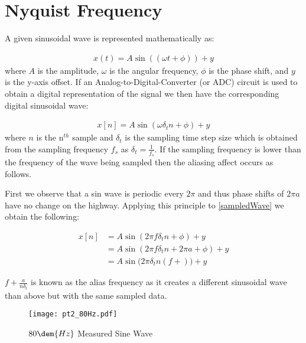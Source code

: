 \documentclass[main.tex]{subfile}
\begin{document}
\section{Nyquist Frequency} 
\label{sec:nyquist_frequency}

A given sinusoidal wave is represented mathematically as:

\begin{align}
  x(t) = A\sin{((\omega t + \phi))} + y
\end{align}
where $A$ is the amplitude, $\omega$ is the angular frequency, $\phi$ is the
phase shift, and $y$ is the y-axis offset. If an Analog-to-Digital-Converter (or
ADC) circuit is used to obtain a digital representation of the signal we then
have the corresponding digital sinusoidal wave: 

\begin{align}
  x[n] = A\sin{(\omega \delta_{t} n + \phi)} + y \label{eq:sampledWave}
\end{align}
where $n$ is the n$^{th}$ sample and $\delta_{t}$ is the sampling time step size
which is obtained from the sampling frequency $f_s$ as $\delta_{t} =
\frac{1}{f_s}$. If the sampling frequency is lower than the frequency of the
wave being sampled then the aliasing affect occurs as follows.

First we observe that a sin wave is periodic every $2\pi$ and thus phase shifts
of $2\pi a$ have no change on the highway. Applying this principle to \eqref{sampledWave}
we obtain the following:

\begin{align}
  x[n] &= A\sin{(2\pi f \delta_{t} n + \phi)} + y \label{eq:sampledWave}
  \\&= A\sin{(2\pi f \delta_{t} n + 2\pi a + \phi)} + y
  \\&= A\sin{(2\pi \delta_{t} n (f + )}) + y
\end{align}

$f + \frac{a}{n\delta_{t}}$ is known as the alias frequency as it creates a different
sinusoidal wave than above but with the same sampled data.


\begin{figure}[H]
  \begin{center}
    \texttt{[image: pt2\_80Hz.pdf]}
  \end{center}
  \caption{$80\dem{Hz}$ Measured Sine Wave}
  \label{fig:pt280hz}
\end{figure}
\end{document}
